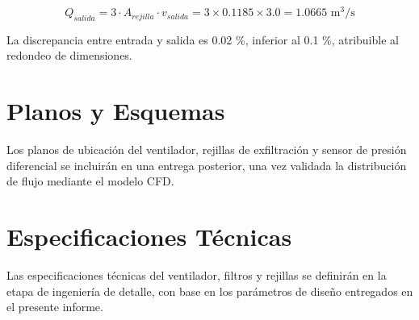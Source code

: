 \begin{equation}
	Q_{salida} = 3 \cdot A_{rejilla} \cdot v_{salida} = 3 \times 0.1185 \times 3.0 = 1.0665 \text{ m}^3/\text{s}
\end{equation}

La discrepancia entre entrada y salida es 0.02 \%, inferior al 0.1 \%, atribuible al redondeo de dimensiones.

\section{Planos y Esquemas}
\label{appendix:drawings}

Los planos de ubicación del ventilador, rejillas de exfiltración y sensor de presión diferencial se incluirán en una entrega posterior, una vez validada la distribución de flujo mediante el modelo CFD.

\section{Especificaciones Técnicas}
\label{appendix:specs}

Las especificaciones técnicas del ventilador, filtros y rejillas se definirán en la etapa de ingeniería de detalle, con base en los parámetros de diseño entregados en el presente informe.
